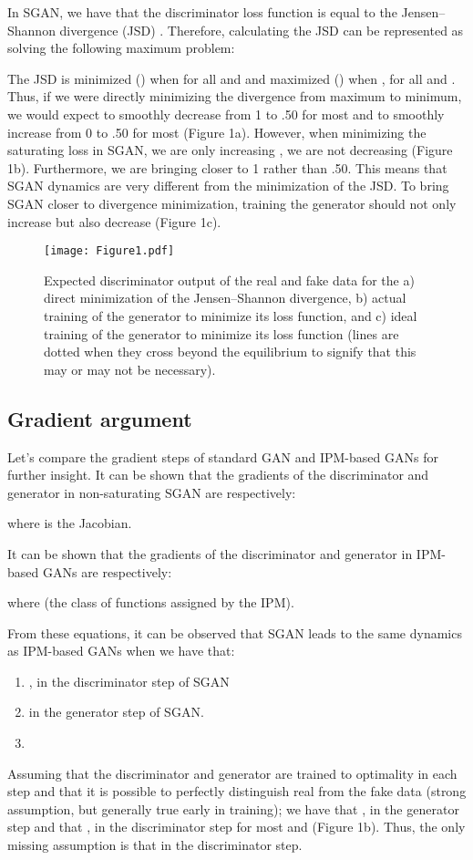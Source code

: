 \documentclass{article}
\begin{document}
In SGAN, we have that the discriminator loss function is equal to the Jensen–Shannon divergence (JSD) \citep{GAN}. Therefore, calculating the JSD can be represented as solving the following maximum problem:



The JSD is minimized () when  for all  and  and maximized () when ,  for all  and . Thus, if we were directly minimizing the divergence from maximum to minimum, we would expect  to smoothly decrease from 1 to .50 for most  and  to smoothly increase from 0 to .50 for most  (Figure 1a). However, when minimizing the saturating loss in SGAN, we are only increasing , we are not decreasing  (Figure 1b). Furthermore, we are bringing  closer to 1 rather than .50. This means that SGAN dynamics are very different from the minimization of the JSD. To bring SGAN closer to divergence minimization, training the generator should not only increase  but also decrease  (Figure 1c).

\begin{figure}
	\centering
	\texttt{[image: Figure1.pdf]}
	\caption{Expected discriminator output of the real and fake data for the a) direct minimization of the Jensen–Shannon divergence, b) actual training of the generator to minimize its loss function, and c) ideal training of the generator to minimize its loss function (lines are dotted when they cross beyond the equilibrium to signify that this may or may not be necessary).}
\end{figure}

\subsection{Gradient argument}

Let's compare the gradient steps of standard GAN and IPM-based GANs for further insight. It can be shown that the gradients of the discriminator and generator in non-saturating SGAN are respectively:


where  is the Jacobian.

It can be shown that the gradients of the discriminator and generator in IPM-based GANs are respectively:


where  (the class of functions assigned by the IPM).

From these equations, it can be observed that SGAN leads to the same dynamics as IPM-based GANs when we have that:
\begin{enumerate}
	\item ,  in the discriminator step of SGAN
	\item  in the generator step of SGAN.
	\item 
\end{enumerate}
Assuming that the discriminator and generator are trained to optimality in each step and that it is possible to perfectly distinguish real from the fake data (strong assumption, but generally true early in training); we have that ,  in the generator step and that ,  in the discriminator step for most  and  (Figure 1b). Thus, the only missing assumption is that  in the discriminator step. 
\end{document}
